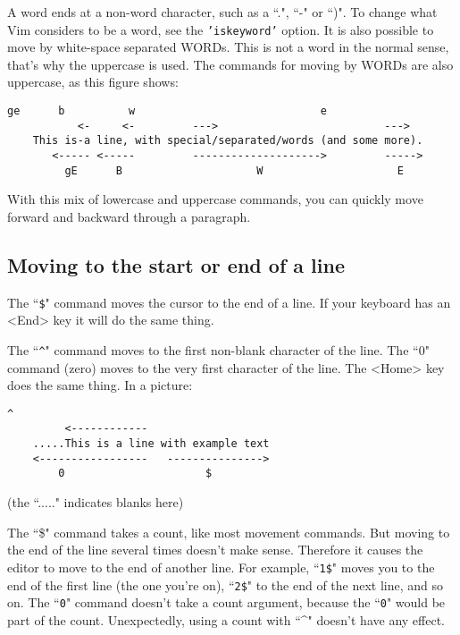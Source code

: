 A word ends at a non-word character, such as a ``.", ``-" or ``)".
To change what Vim considers to be a word, see the \texttt{'iskeyword'} option.
It is also possible to move by white-space separated WORDs.
This is not a word in the normal sense, that's why the uppercase is used.
The commands for moving by WORDs are also uppercase, as this figure shows:

\begin{Verbatim}[samepage=true]
           ge      b          w                             e
           <-     <-         --->                          --->
    This is-a line, with special/separated/words (and some more). 
       <----- <-----         -------------------->         ----->
         gE      B                     W                     E
\end{Verbatim}

With this mix of lowercase and uppercase commands, you can quickly move forward and backward through a paragraph.

\subsection{Moving to the start or end of a line}

The ``\texttt{\$}" command moves the cursor to the end of a line.
If your keyboard has an <End> key it will do the same thing.

The ``\texttt{\^{}}" command moves to the first non-blank character of the line.
The ``0" command (zero) moves to the very first character of the line.
The <Home> key does the same thing.
In a picture:

\begin{Verbatim}[samepage=true]
               ^
         <------------
    .....This is a line with example text 
    <-----------------   --------------->
        0                      $
\end{Verbatim}

(the ``....." indicates blanks here)

The ``\$" command takes a count, like most movement commands.
But moving to the end of the line several times doesn't make sense.
Therefore it causes the editor to move to the end of another line.
For example, ``\texttt{1\$}" moves you to the end of the first line (the one you're on), ``\texttt{2\$}" to the end of the next line, and so on.
The ``\texttt{0}" command doesn't take a count argument, because the ``\texttt{0}" would be part of the count.
Unexpectedly, using a count with ``\textasciicircum" doesn't have any effect.

